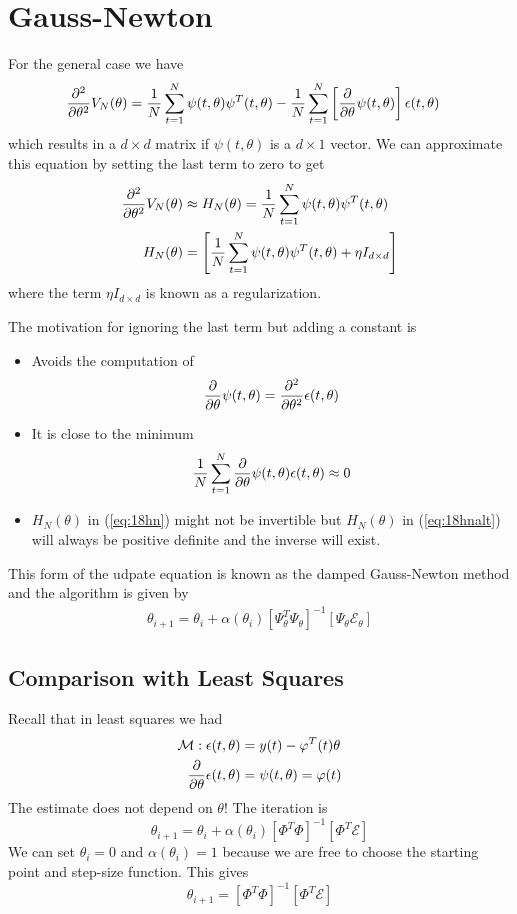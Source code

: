 \section{Gauss-Newton}
For the general case we have
\begin{align*}
\frac{\partial^2}{\partial\theta^2}V_N(\theta) &= \frac{1}{N}\sum_{t=1}^N\psi(t,\theta)\psi^T(t,\theta) - \frac{1}{N}\sum_{t=1}^N\left[\frac{\partial}{\partial\theta}\psi(t,\theta)\right]\epsilon(t,\theta)
\end{align*}
which results in a $d\times d$ matrix if $\psi(t,\theta)$ is a $d\times1$ vector. We can approximate this equation by setting the last term to zero to get
\begin{align}
\label{eq:18hn}
\frac{\partial^2}{\partial\theta^2}V_N(\theta) &\approx H_N(\theta) = \frac{1}{N}\sum_{t=1}^N\psi(t,\theta)\psi^T(t,\theta) \\
\label{eq:18hnalt}
H_N(\theta) &= \left[\frac{1}{N}\sum_{t=1}^N\psi(t,\theta)\psi^T(t,\theta) + \eta I_{d\times d}\right]
\end{align}
where the term $\eta I_{d\times d}$ is known as a regularization.

The motivation for ignoring the last term but adding a constant is
\begin{itemize}
\item Avoids the computation of
$$\frac{\partial}{\partial\theta}\psi(t,\theta) = \frac{\partial^2}{\partial\theta^2}\epsilon(t,\theta)$$
\item It is close to the minimum
$$\frac{1}{N}\sum_{t=1}^N\frac{\partial}{\partial\theta}\psi(t,\theta)\epsilon(t,\theta) \approx 0$$
\item $H_N(\theta)$ in (\ref{eq:18hn}) might not be invertible but $H_N(\theta)$ in (\ref{eq:18hnalt}) will always be positive definite and the inverse will exist.
\end{itemize}
This form of the udpate equation is known as the damped Gauss-Newton method and the algorithm is given by
\begin{align*}
\boxed{\theta_{i+1} = \theta_i + \alpha(\theta_i)\left[\Psi_\theta^T\Psi_\theta\right]^{-1} \left[\Psi_\theta\mathcal{E}_\theta\right]}
\end{align*}

\subsection{Comparison with Least Squares}
Recall that in least squares we had
\begin{align*}
\mathcal{M}: \epsilon(t,\theta) &= y(t) - \varphi^T(t)\theta \\
\frac{\partial}{\partial\theta}\epsilon(t,\theta) &= \psi(t,\theta) = \varphi(t)
\end{align*}
The estimate does not depend on $\theta$! The iteration is
$$\theta_{i+1} = \theta_i + \alpha(\theta_i)\left[\Phi^T\Phi\right]^{-1}\left[\Phi^T\mathcal{E}\right]$$
We can set $\theta_i=0$ and $\alpha(\theta_i)=1$ because we are free to choose the starting point and step-size function. This gives
$$\theta_{i+1} = \left[\Phi^T\Phi\right]^{-1}\left[\Phi^T\mathcal{E}\right]$$


